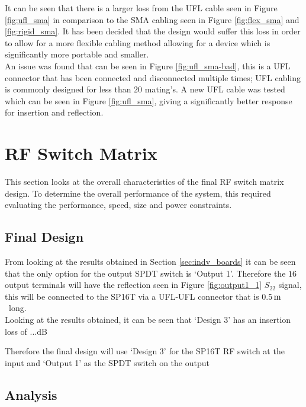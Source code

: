 \documentclass[12pt,openany,a4paper]{book}
\newcommand{\m}		{\ensuremath{\rm\,m}}
\begin{document}
It can be seen that there is a larger loss from the UFL cable seen in Figure \ref{fig:ufl_sma} in comparison to the SMA cabling seen in Figure \ref{fig:flex_sma} and \ref{fig:rigid_sma}. It has been decided that the design would suffer this loss in order to allow for a more flexible cabling method allowing for a device which is significantly more portable and smaller. \\
An issue was found that can be seen in Figure \ref{fig:ufl_sma-bad}, this is a UFL connector that has been connected and disconnected multiple times; UFL cabling is commonly designed for less than $20$ mating's. A new UFL cable was tested which can be seen in Figure \ref{fig:ufl_sma}, giving a significantly better response for insertion and reflection.

\section{RF Switch Matrix}
This section looks at the overall characteristics of the final RF switch matrix design. To determine the overall performance of the system, this required evaluating the performance, speed, size and power constraints.

\subsection{Final Design}
From looking at the results obtained in Section \ref{sec:indv_boards} it can be seen that the only option for the output SPDT switch is `Output 1'. Therefore the $16$ output terminals will have the reflection seen in Figure \ref{fig:output1_1} $S_{22}$ signal, this will be connected to the SP16T via a UFL-UFL connector that is 0.5\m \ long. \\
Looking at the results obtained, it can be seen that `Design 3' has an insertion loss of ...dB 


Therefore the final design will use `Design 3' for the SP16T RF switch at the input and `Output 1' as the SPDT switch on the output

\subsection{Analysis}
\end{document}

